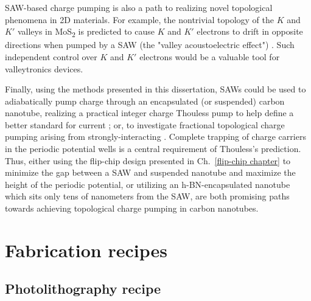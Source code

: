 \documentclass[double,12pt,1in,seploa]{beavtex}
\let\Oldsection\section
\renewcommand{\section}{\FloatBarrier\Oldsection}
\begin{document}
SAW-based charge pumping is also a path to realizing novel topological phenomena in 2D materials. For example, the nontrivial topology of the $K$ and $K'$ valleys in MoS\textsubscript{2} is predicted to cause $K$ and $K'$ electrons to drift in opposite directions when pumped by a SAW (the "valley acoustoelectric effect") \cite{kalameitsev_valley_2019}. Such independent control over $K$ and $K'$ electrons would be a valuable tool for valleytronics devices.

Finally, using the methods presented in this dissertation, SAWs could be used to adiabatically pump charge through an encapsulated (or suspended) carbon nanotube, realizing a practical integer charge Thouless pump to help define a better standard for current \cite{pekola_single-electron_2013,scherer_singleelectron_2019}; or, to investigate fractional topological charge pumping arising from strongly-interacting  \cite{novikov_devils_2005}. Complete trapping of charge carriers in the periodic potential wells is a central requirement of Thouless's prediction. Thus, either using the flip-chip design presented in Ch.\ \ref{flip-chip chapter} to minimize the gap between a SAW and suspended nanotube and maximize the height of the periodic potential, or utilizing an h-BN-encapsulated nanotube which sits only tens of nanometers from the SAW, are both promising paths towards achieving topological charge pumping in carbon nanotubes.


\pagebreak




\pagebreak

\appendix
\chapter{Fabrication recipes}

\section{Photolithography recipe} \label{photolithography recipe}
\end{document}
